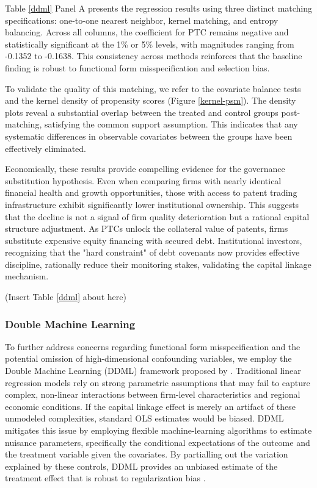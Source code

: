 \documentclass[12pt,a4paper]{article}
\begin{document}
Table \ref{ddml} Panel A presents the regression results using three distinct matching specifications: one-to-one nearest neighbor, kernel matching, and entropy balancing. Across all columns, the coefficient for PTC remains negative and statistically significant at the 1\% or 5\% levels, with magnitudes ranging from -0.1352 to -0.1638. This consistency across methods reinforces that the baseline finding is robust to functional form misspecification and selection bias.

To validate the quality of this matching, we refer to the covariate balance tests and the kernel density of propensity scores (Figure \ref{kernel-psm}). The density plots reveal a substantial overlap between the treated and control groups post-matching, satisfying the common support assumption. This indicates that any systematic differences in observable covariates between the groups have been effectively eliminated.

Economically, these results provide compelling evidence for the governance substitution hypothesis. Even when comparing firms with nearly identical financial health and growth opportunities, those with access to patent trading infrastructure exhibit significantly lower institutional ownership. This suggests that the decline is not a signal of firm quality deterioration but a rational capital structure adjustment. As PTCs unlock the collateral value of patents, firms substitute expensive equity financing with secured debt. Institutional investors, recognizing that the "hard constraint" of debt covenants now provides effective discipline, rationally reduce their monitoring stakes, validating the capital linkage mechanism.


\begin{center}
    (Insert Table \ref{ddml} about here)
\end{center}

\subsubsection{Double Machine Learning}
To further address concerns regarding functional form misspecification and the potential omission of high-dimensional confounding variables, we employ the Double Machine Learning (DDML) framework proposed by \cite{chernozhukov2018double}. Traditional linear regression models rely on strong parametric assumptions that may fail to capture complex, non-linear interactions between firm-level characteristics and regional economic conditions. If the capital linkage effect is merely an artifact of these unmodeled complexities, standard OLS estimates would be biased. DDML mitigates this issue by employing flexible machine-learning algorithms to estimate nuisance parameters, specifically the conditional expectations of the outcome and the treatment variable given the covariates. By partialling out the variation explained by these controls, DDML provides an unbiased estimate of the treatment effect that is robust to regularization bias \citep{mullainathan2017machine}.
\end{document}

